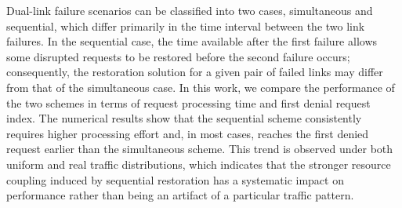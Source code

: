 \documentclass[conference]{IEEEtran}
\begin{document}
Dual-link failure scenarios can be classified into two cases, simultaneous and sequential, which differ primarily in the time interval between the two link failures. In the sequential case, the time available after the first failure allows some disrupted requests to be restored before the second failure occurs; consequently, the restoration solution for a given pair of failed links may differ from that of the simultaneous case. In this work, we compare the performance of the two schemes in terms of request processing time and first denial request index. The numerical results show that the sequential scheme consistently requires higher processing effort and, in most cases, reaches the first denied request earlier than the simultaneous scheme. This trend is observed under both uniform and real traffic distributions, which indicates that the stronger resource coupling induced by sequential restoration has a systematic impact on performance rather than being an artifact of a particular traffic pattern.

\clearpage



\end{document}
